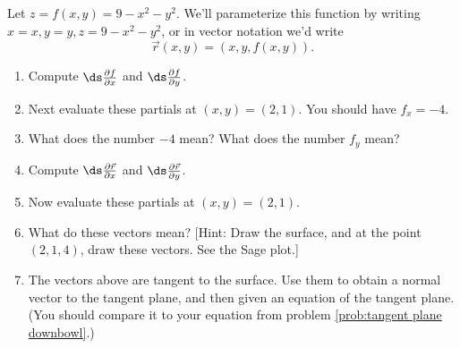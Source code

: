 \begin{problem}
Let $z=f(x,y)=9-x^2-y^2$. We'll parameterize this function by writing $x=x, y=y, z=9-x^2-y^2$, or in vector notation we'd write $$\vec r(x,y) = (x,y,f(x,y)).$$ 
	
 
\begin{enumerate}
	\item Compute $\ds \frac{\partial f}{\partial x}$ and $\ds \frac{\partial f}{\partial y}$. 
	\item Next evaluate these partials at $(x,y)=(2,1)$. You should have $f_x=-4$. 
	\item What does the number $-4$ mean? What does the number $f_y$ mean? 
	\item Compute $\ds \frac{\partial \vec r}{\partial x}$ and $\ds \frac{\partial \vec r}{\partial y}$. 
	\item Now evaluate these partials at $(x,y)=(2,1)$.  
	\item What do these vectors mean? [Hint: Draw the surface, and at the point $(2,1,4)$, draw these vectors. See the Sage plot.]
	\item The vectors above are tangent to the surface. Use them to obtain a normal vector to the tangent plane, and then given an equation of the tangent plane. (You should compare it to your equation from problem \ref{prob:tangent plane downbowl}.)
\end{enumerate}
\end{problem}


